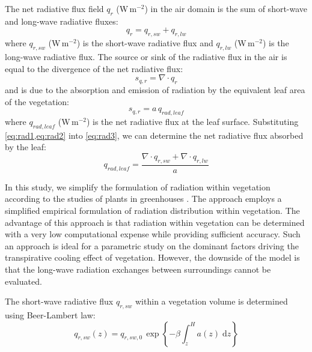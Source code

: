 The net radiative flux field $q_r$ (W\,m$^{-2}$) in the air domain is the sum of short-wave and long-wave radiative fluxes:
\begin{equation}
{q_r} = {q_{\mathit{r,sw}}} + {q_{\mathit{r,lw}}}
\label{eq:rad1}
\end{equation}
where $q_{\mathit{r,sw}}$ (W\,m$^{-2}$) is the short-wave radiative flux and $q_{\mathit{r,lw}}$ (W\,m$^{-2}$) is the long-wave radiative flux. The source or sink of the radiative flux in the air is equal to the divergence of the net radiative flux:
\begin{equation}
s_{q,r} = \nabla \cdot q_r
\label{eq:rad2}
\end{equation}
and is due to the absorption and emission of radiation by the equivalent leaf area of the vegetation:
\begin{equation}
{s_{q,r}} = a \, {q_{\mathit{rad,leaf}}}
\label{eq:rad3}
\end{equation}
where $q_{\mathit{rad,leaf}}$ (W\,m$^{-2}$) is the net radiative flux at the leaf surface. Substituting \cref{eq:rad1,eq:rad2} into \cref{eq:rad3}, we can determine the net radiative flux absorbed by the leaf:
\begin{equation}
{q_{\mathit{rad,leaf}}} = \frac{{\nabla  \cdot {q_{\mathit{r,sw}}} + \nabla  \cdot {q_{\mathit{r,lw}}}}}{a}
\label{eq:qradleaf}
\end{equation}

In this study, we simplify the formulation of radiation within vegetation according to the studies of plants in greenhouses \citep{Boulard2002, Majdoubi2009, Fatnassi2006, Kichah2012}. The approach employs a simplified empirical formulation of radiation distribution within vegetation. The advantage of this approach is that radiation within vegetation can be determined with a very low computational expense while providing sufficient accuracy. Such an approach is ideal for a parametric study on the dominant factors driving the transpirative cooling effect of vegetation. However, the downside of the model is that the long-wave radiation exchanges between surroundings cannot be evaluated.

The short-wave radiative flux $q_{\mathit{r,sw}}$ within a vegetation volume is determined using Beer-Lambert law:
\begin{equation}
{q_{r,sw}}(z) = {q_{r,sw,0}}\,{\exp}\left\{ - \beta \int_z^H {a\left( z \right)} \;\mathrm{d}z \right\}
\label{eq:beerlambert}
\end{equation}

